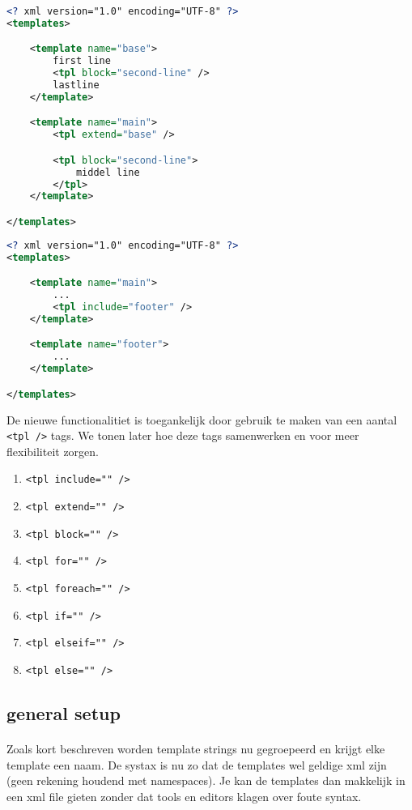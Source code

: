 \begin{lstlisting}[language=xml]
<? xml version="1.0" encoding="UTF-8" ?>
<templates>

	<template name="base">
		first line
		<tpl block="second-line" />
		lastline
	</template>

	<template name="main">
		<tpl extend="base" />

		<tpl block="second-line">
			middel line
		</tpl>
	</template>

</templates>
\end{lstlisting}

\begin{lstlisting}[language=xml]
<? xml version="1.0" encoding="UTF-8" ?>
<templates>

	<template name="main">
		...
		<tpl include="footer" />
	</template>

	<template name="footer">
		...
	</template>

</templates>
\end{lstlisting}

De nieuwe functionalitiet is toegankelijk door gebruik te maken van een aantal
\lstinline{<tpl />} tags. We tonen later hoe deze tags samenwerken en voor meer
flexibiliteit zorgen.

\begin{enumerate}
	\item \lstinline{<tpl include="" />}
	\item \lstinline{<tpl extend="" />}
	\item \lstinline{<tpl block="" />}
	\item \lstinline{<tpl for="" />}
	\item \lstinline{<tpl foreach="" />}
	\item \lstinline{<tpl if="" />}
	\item \lstinline{<tpl elseif="" />}
	\item \lstinline{<tpl else="" />}
\end{enumerate}


\subsection {general setup}

\paragraph {} Zoals kort beschreven worden template strings nu gegroepeerd en krijgt elke
template een naam. De systax is nu zo dat de templates wel geldige xml zijn (geen
rekening houdend met namespaces). Je kan de templates dan makkelijk in een xml file
gieten zonder dat tools en editors klagen over foute syntax.

